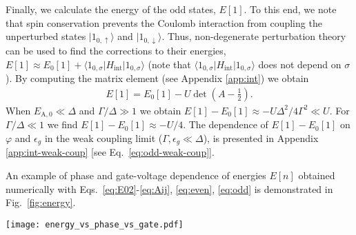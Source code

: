 \documentclass[aps,reprint,longbibliography, prb]{revtex4-2}
\begin{document}
Finally, we calculate the energy of the odd states, $E[1]$. To this end, we note that spin conservation prevents the Coulomb interaction from coupling the unperturbed states $|1_{0,\uparrow}\rangle$ and $|1_{0,\downarrow}\rangle$. Thus, non-degenerate perturbation theory can be used to find the corrections to their energies, $E[1] \approx E_0[1] + \langle 1_{0,\sigma} |H_\mathrm{int}|1_{0,\sigma}\rangle$ (note that $\langle 1_{0,\sigma} |H_\mathrm{int}|1_{0,\sigma}\rangle$ does not depend on $\sigma$). By computing the matrix element (see Appendix \ref{app:int}) we obtain
\begin{gather}
    \label{eq:odd}
    E[1] = E_0[1] - U\det\left(A - \frac{1}{2}\right).
\end{gather}
When $E_\mathrm{A,0}\ll \Delta$ and $\Gamma/\Delta \gg 1$ we obtain $E[1]-E_0[1] \approx -U\Delta^2/4\Gamma^2 \ll U$. For $\Gamma/\Delta \ll 1$ we find $E[1]-E_0[1] \approx -U/4$. The dependence of $E[1] - E_0[1]$ on $\varphi$  and $\epsilon_g$ in the weak coupling limit ($\Gamma, \epsilon_g \ll \Delta$), is presented in Appendix \ref{app:int-weak-coup} [see Eq.~\eqref{eq:odd-weak-coup}].

An example of phase and gate-voltage dependence of energies $E[n]$ obtained numerically with Eqs.~\eqref{eq:E02}-\eqref{eq:Aij}, \eqref{eq:even}, \eqref{eq:odd} is demonstrated in Fig.~\ref{fig:energy}.
\begin{figure*}[t]
  \begin{center}
    \texttt{[image: energy\_vs\_phase\_vs\_gate.pdf]}
    \caption{Energies $E[n]$ of states with $n$ quasiparticles at the Andreev bound state as functions of $\varphi$ [panel (a)] and $\epsilon_g = - e V_g$ [panel (b)]; the energies are calculated with respect to $E[0]$ evaluated at $\varphi = 0$ and $\epsilon_g = 0$. The plots are produced using Eqs.~\eqref{eq:E02}-\eqref{eq:Aij}, \eqref{eq:even}, \eqref{eq:odd} with
    $\Gamma_L = 0.3 \Delta$, $\Gamma_R = 0.35 \Delta$, $U = 0.35 \Delta$. The phase dependence in panel (a) is plotted for $\epsilon_g = 0$. The gate voltage dependence in panel (b) is plotted for $\varphi = \pi$; note that $\epsilon_g$ is computed with respect to the charge-degeneracy point  $\epsilon_g = 0$. Dashed line shows the half-sum between energies $E[0]$ and $E[2]$. The fact that the dashed line does not coincide with $E[1]$ is due to the presence of Coulomb interaction at the resonant level; the difference between $(E[0]+E[2])/2$ and $E[1]$ is given by $E_\mathrm{asym}$, see Eq.~\eqref{eq:asym-vs-U}. Note that close to $\varphi = \pi$ and $\epsilon_g=0$ even a weak Coulomb interaction can render the ground state of the system odd in the electron number.
    \label{fig:energy}} 
  \end{center}
\end{figure*}
\end{document}
